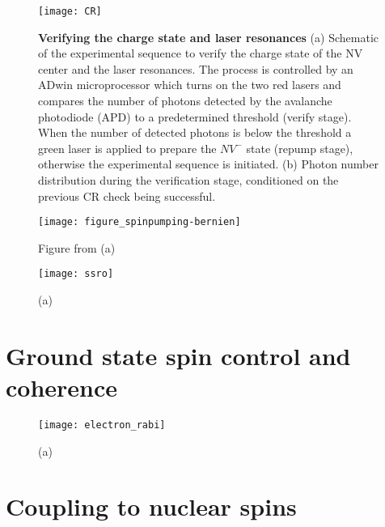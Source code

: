 \begin{figure*}
	\centering
	\texttt{[image: CR]}
	\caption{\label{fig:tam-fig4-cr} \textbf{Verifying the charge state and laser resonances} (a) Schematic of the experimental sequence to verify the charge state of the NV center and the laser resonances. The process is controlled by an ADwin microprocessor which turns on the two red lasers and compares the number of photons detected by the avalanche photodiode (APD) to a predetermined threshold (verify stage). When the number of detected photons is below the threshold a green laser is applied to prepare the $NV^-$ state (repump stage), otherwise the experimental sequence is initiated. (b) Photon number distribution during the verification stage, conditioned on the previous CR check being successful. }
\end{figure*}


\begin{figure*}
	\centering
	\texttt{[image: figure\_spinpumping-bernien]}
	\caption{\label{fig:tam-fig5-SP} Figure from \cite{Bernien__2014} \textbf{} (a) }
\end{figure*}

\begin{figure*}
	\centering
	\texttt{[image: ssro]}
	\caption{\label{fig:tam-fig6-ssro} \textbf{} (a) }
\end{figure*}

\section{Ground state spin control and coherence}
\label{sec:groundstatecontrol}
\begin{figure*}
	\centering
	\texttt{[image: electron\_rabi]}
	\caption{\label{fig:tam-fig7-erabi} \textbf{} (a) }
\end{figure*}



\section{Coupling to nuclear spins}





\newpage





